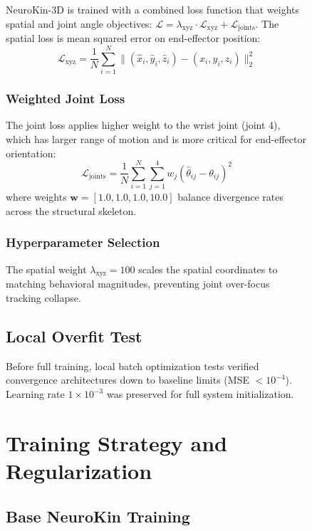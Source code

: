 \documentclass[12pt,a4paper,oneside]{report}
\begin{document}
\begin{figure}[H]
NeuroKin-3D is trained with a combined loss function that weights spatial and joint angle objectives: $\mathcal{L} = \lambda_{\text{xyz}} \cdot \mathcal{L}_{\text{xyz}} + \mathcal{L}_{\text{joints}}$. The spatial loss is mean squared error on end-effector position:
\begin{equation}
\mathcal{L}_{\text{xyz}} = \frac{1}{N} \sum_{i=1}^{N} \|(\hat{x}_i, \hat{y}_i, \hat{z}_i) - (x_i, y_i, z_i)\|_2^2
\end{equation}

\subsubsection{Weighted Joint Loss}

The joint loss applies higher weight to the wrist joint (joint 4), which has larger range of motion and is more critical for end-effector orientation:
\begin{equation}
\mathcal{L}_{\text{joints}} = \frac{1}{N} \sum_{i=1}^{N} \sum_{j=1}^{4} w_j (\hat{\theta}_{ij} - \theta_{ij})^2
\end{equation}
where weights $\mathbf{w} = [1.0, 1.0, 1.0, 10.0]$ balance divergence rates across the structural skeleton.

\subsubsection{Hyperparameter Selection}

The spatial weight $\lambda_{\text{xyz}} = 100$ scales the spatial coordinates to matching behavioral magnitudes, preventing joint over-focus tracking collapse.

\subsection{Local Overfit Test}

Before full training, local batch optimization tests verified convergence architectures down to baseline limits (MSE $< 10^{-4}$). Learning rate $1 \times 10^{-3}$ was preserved for full system initialization.

\section{Training Strategy and Regularization}

\subsection{Base NeuroKin Training}


\end{figure}
\end{document}
